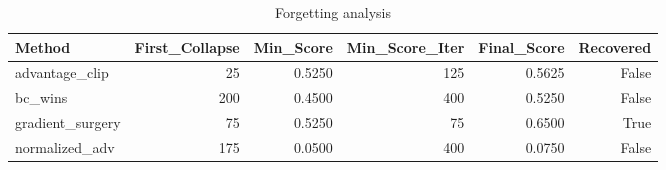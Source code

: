 \begin{table}[htbp]
\centering
\caption{Forgetting analysis}
\label{tab:forgetting}
\begin{tabular}{lrrrrr}
\toprule
\textbf{Method} & \textbf{First\_Collapse} & \textbf{Min\_Score} & \textbf{Min\_Score\_Iter} & \textbf{Final\_Score} & \textbf{Recovered} \\
\midrule
advantage\_clip & 25 & 0.5250 & 125 & 0.5625 & False \\
bc\_wins & 200 & 0.4500 & 400 & 0.5250 & False \\
gradient\_surgery & 75 & 0.5250 & 75 & 0.6500 & True \\
normalized\_adv & 175 & 0.0500 & 400 & 0.0750 & False \\
\bottomrule
\end{tabular}
\end{table}